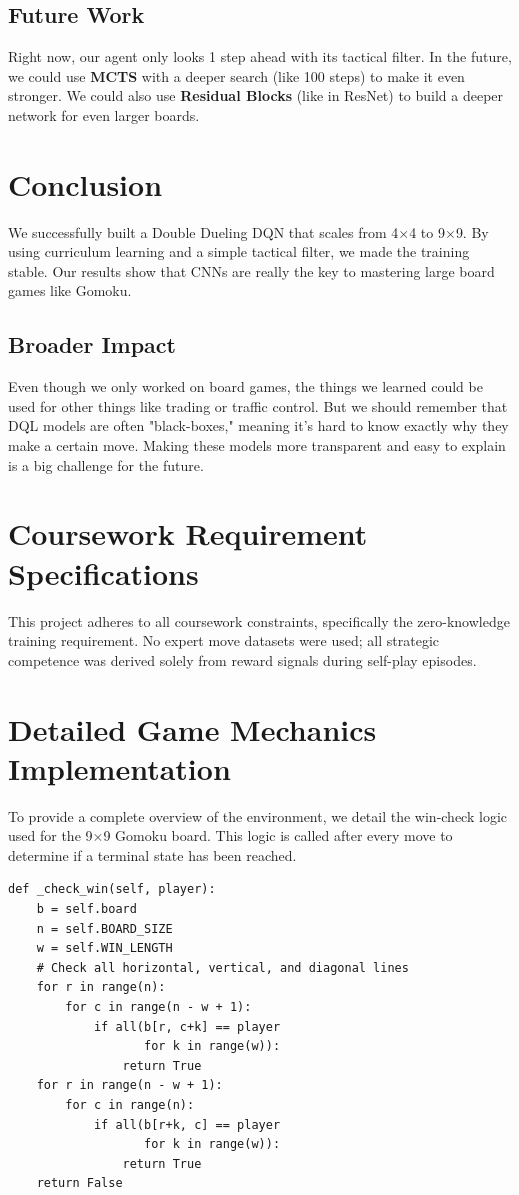 \documentclass[9pt,a4paper,twocolumn,twoside]{rho-class/rho}
\begin{document}
    \subsection{Future Work}
        Right now, our agent only looks 1 step ahead with its tactical filter. In the future, we could use \textbf{MCTS} with a deeper search (like 100 steps) to make it even stronger. We could also use \textbf{Residual Blocks} (like in ResNet) to build a deeper network for even larger boards.

\section{Conclusion}
    We successfully built a Double Dueling DQN that scales from 4$\times$4 to 9$\times$9. By using curriculum learning and a simple tactical filter, we made the training stable. Our results show that CNNs are really the key to mastering large board games like Gomoku.

    \subsection{Broader Impact}
    Even though we only worked on board games, the things we learned could be used for other things like trading or traffic control. But we should remember that DQL models are often "black-boxes," meaning it's hard to know exactly why they make a certain move. Making these models more transparent and easy to explain is a big challenge for the future.

\appendix
\section{Coursework Requirement Specifications}
This project adheres to all coursework constraints, specifically the zero-knowledge training requirement. No expert move datasets were used; all strategic competence was derived solely from reward signals during self-play episodes.

\section{Detailed Game Mechanics Implementation}
To provide a complete overview of the environment, we detail the win-check logic used for the 9$\times$9 Gomoku board. This logic is called after every move to determine if a terminal state has been reached.

{\footnotesize
\begin{verbatim}
def _check_win(self, player):
    b = self.board
    n = self.BOARD_SIZE
    w = self.WIN_LENGTH
    # Check all horizontal, vertical, and diagonal lines
    for r in range(n):
        for c in range(n - w + 1):
            if all(b[r, c+k] == player 
                   for k in range(w)):
                return True
    for r in range(n - w + 1):
        for c in range(n):
            if all(b[r+k, c] == player 
                   for k in range(w)):
                return True
    return False
\end{verbatim}
}
\end{document}
